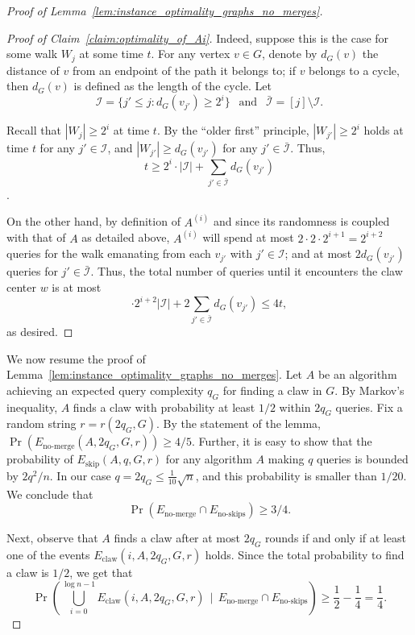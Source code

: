 \documentclass[11pt]{article}
\numberwithin{equation}{section}
\newcommand{\1}{\mathbf{1}}
\begin{document}
\begin{proof}[Proof of Lemma~\ref{lem:instance_optimality_graphs_no_merges}]
\begin{proof}[Proof of Claim~\ref{claim:optimality_of_Ai}]
Indeed, suppose this is the case for some walk $W_j$ at some time $t$. For any vertex $v \in G$, denote by $d_G(v)$ the distance of $v$ from an endpoint of the path it belongs to; if $v$ belongs to a cycle, then $d_G(v)$ is defined as the length of the cycle.
Let $$\mathcal{I} = \{j' \leq j : \text{$d_G(v_{j'}) \geq 2^i$}\} \ \ \text{ and }\ \  \bar{\mathcal{I}} = [j] \setminus \mathcal{I}.$$

Recall that $|W_j| \geq 2^{i}$ at time $t$. By the ``older first'' principle, $|W_{j'}| \geq 2^i$ holds at time $t$ for any $j' \in \mathcal{I}$, and $|W_{j'}| \geq d_G(v_{j'})$ for any $j' \in \bar{\mathcal{I}}$. Thus, 
$$t \geq 2^i \cdot |\mathcal{I}| + \sum_{j' \in \bar{\mathcal{I}}} d_G(v_{j'})$$. 

On the other hand, by definition of $A^{(i)}$ and since its randomness is coupled with that of $A$ as detailed above, $A^{(i)}$ will spend at most $2 \cdot 2 \cdot 2^{i+1} = 2^{i+2}$ queries for the walk emanating from each $v_{j'}$ with $j' \in \mathcal{I}$; and at most $2 d_G(v_{j'})$ queries for $j' \in \bar{\mathcal{I}}$. Thus, the total number of queries until it encounters the claw center $w$ is at most
$$
\cdot 2^{i+2} |\mathcal{I}| + 2 \sum_{j' \in \bar{\mathcal{I}}} d_G(v_{j'}) \leq 4t,
$$
as desired.
\end{proof}

We now resume the proof of Lemma~\ref{lem:instance_optimality_graphs_no_merges}. 
Let $A$ be an algorithm achieving an expected query complexity $q_G$ for finding a claw in $G$. By Markov's inequality, $A$ finds a claw with probability at least $1/2$ within $2q_G$ queries. Fix a random string $r = r(2q_G,G)$. By the statement of the lemma, 
$\Pr(E_{\text{no-merge}}(A, 2q_G, G, r)) \geq 4/5$. 
Further, it is easy to show that the probability of $E_{\text{skip}}(A,q,G,r)$ for any algorithm $A$ making $q$ queries is bounded by $2q^2 / n$. 
In our case $q = 2q_G \leq \frac{1}{10}\sqrt{n}$, and this probability is smaller than $1/20$. We conclude that $$\Pr(E_{\text{no-merge}} \cap E_{\text{no-skips}}) \geq 3/4.$$

Next, observe that $A$ finds a claw after at most $2q_G$ rounds if and only if at least one of the events $E_{\text{claw}}(i, A, 2q_G, G, r)$ holds. Since the total probability to find a claw is $1/2$, we get that
$$
\Pr\left(\bigcup_{i=0}^{\log n - 1} E_{\text{claw}}(i,A, 2q_G,G,  r)\ \  |\ \  E_{\text{no-merge}} \cap E_{\text{no-skips}}\right) \geq \frac{1}{2} - \frac{1}{4} = \frac{1}{4}.
$$


\end{proof}
\end{document}
